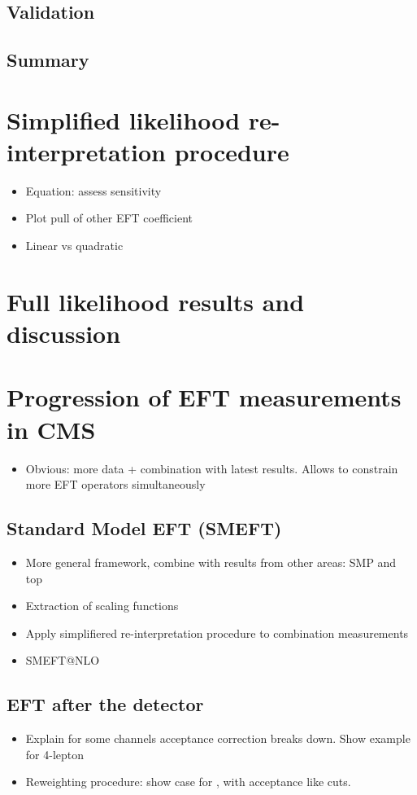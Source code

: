 \subsection{Validation}

\subsection{Summary}

\section{Simplified likelihood re-interpretation procedure}\label{sec:eft_simplified}
\begin{itemize}
    \item Equation: assess sensitivity
    \item Plot pull of other EFT coefficient
    \item Linear vs quadratic
\end{itemize}

\section{Full likelihood results and discussion}\label{sec:eft_results}

\section{Progression of EFT measurements in CMS}\label{sec:eft_improving}
\begin{itemize}
    \item Obvious: more data + combination with latest results. Allows to constrain more EFT operators simultaneously
\end{itemize}

\subsection{Standard Model EFT (SMEFT)}
\begin{itemize}
    \item More general framework, combine with results from other areas: SMP and top
    \item Extraction of scaling functions
    \item Apply simplifiered re-interpretation procedure to combination measurements
    \item SMEFT@NLO
\end{itemize}

\subsection{EFT after the detector}\label{sec:eft_acceptance_corrections}
\begin{itemize}
    \item Explain for some channels acceptance correction breaks down. Show example for 4-lepton
    \item Reweighting procedure: show case for \Hgg, with acceptance like cuts.
\end{itemize}
